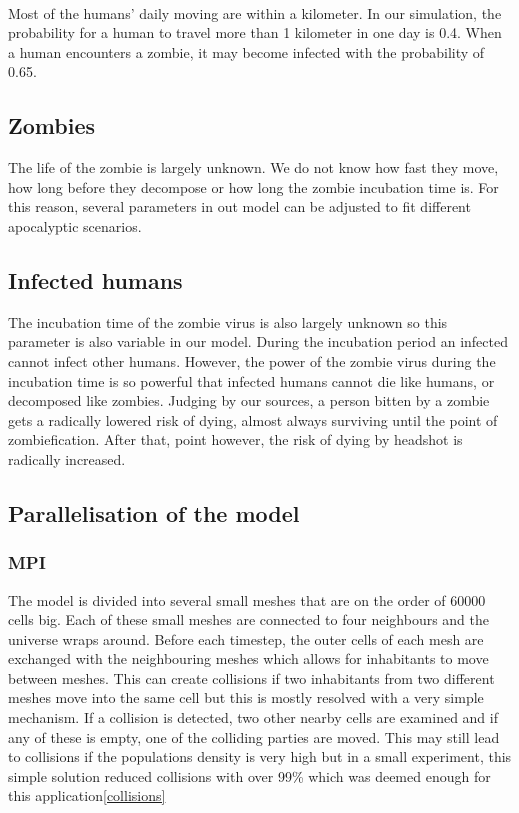 \documentclass{report}
\begin{document}
\paragraph{}
Most of the humans' daily moving are within a kilometer. In our simulation, the probability for a human to travel more than 1 kilometer in one day is 0.4. When a human encounters a zombie, it may become infected with the probability of 0.65.

\subsection{Zombies}
The life of the zombie is largely unknown. We do not know how fast they move, how long before they decompose or how long the zombie incubation time is. For this reason, several parameters in out model can be adjusted to fit different apocalyptic scenarios.

\subsection{Infected humans}
The incubation time of the zombie virus is also largely unknown so this parameter is also variable in our model. During the incubation period an infected cannot infect other humans. However, the power of the zombie virus during the incubation time is so powerful that infected humans cannot die like humans, or decomposed like zombies. Judging by our sources\cite{deadheads}, a person bitten by a zombie gets a radically lowered risk of dying, almost always surviving until the point of zombiefication. After that, point however, the risk of dying by headshot is radically increased.

\subsection{Parallelisation of the model}
\subsubsection{MPI}
The model is divided into several small meshes that are on the order of 60000 cells big. Each of these small meshes are connected to four neighbours and the universe wraps around. Before each timestep, the outer cells of each mesh are exchanged with the neighbouring meshes which allows for inhabitants to move between meshes. This can create collisions if two inhabitants from two different meshes move into the same cell but this is mostly resolved with a very simple mechanism. If a collision is detected, two other nearby cells are examined and if any of these is empty, one of the colliding parties are moved. This may still lead to collisions if the populations density is very high but in a small experiment, this simple solution reduced collisions with over 99\% which was deemed enough for this application\ref{collisions}
\end{document}
